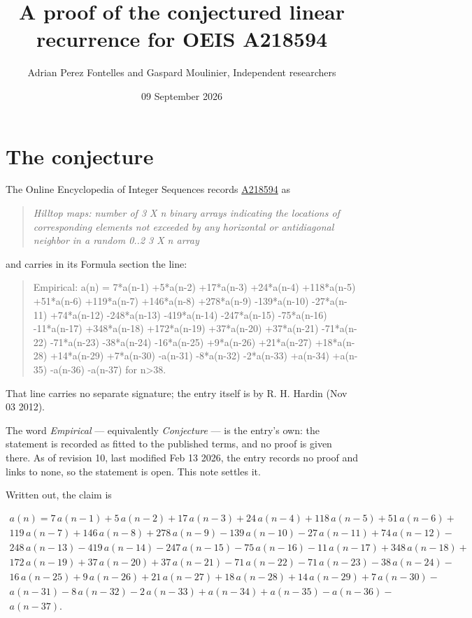 \documentclass[11pt]{article}
\title{A proof of the conjectured linear recurrence for OEIS A218594}
\author{Adrian Perez Fontelles and Gaspard Moulinier, Independent researchers}
\date{09 September 2026}
\theoremstyle{definition}
\begin{document}
\maketitle
\section{The conjecture}

The Online Encyclopedia of Integer Sequences records \href{https://oeis.org/A218594}{A218594} as

\begin{quote}\itshape Hilltop maps: number of 3 X n binary arrays indicating the locations of corresponding elements not exceeded by any horizontal or antidiagonal neighbor in a random 0..2 3 X n array\end{quote}

and carries in its Formula section the line:

\begin{quote}\ttfamily Empirical: a(n) = 7*a(n-1) +5*a(n-2) +17*a(n-3) +24*a(n-4) +118*a(n-5) +51*a(n-6) +119*a(n-7) +146*a(n-8) +278*a(n-9) -139*a(n-10) -27*a(n-11) +74*a(n-12) -248*a(n-13) -419*a(n-14) -247*a(n-15) -75*a(n-16) -11*a(n-17) +348*a(n-18) +172*a(n-19) +37*a(n-20) +37*a(n-21) -71*a(n-22) -71*a(n-23) -38*a(n-24) -16*a(n-25) +9*a(n-26) +21*a(n-27) +18*a(n-28) +14*a(n-29) +7*a(n-30) -a(n-31) -8*a(n-32) -2*a(n-33) +a(n-34) +a(n-35) -a(n-36) -a(n-37) for n>38.\end{quote}

That line carries no separate signature; the entry itself is by R. H. Hardin (Nov 03 2012).

The word {\itshape Empirical} --- equivalently {\itshape Conjecture} --- is the entry's own: the statement is recorded as fitted to the published terms, and no proof is given there. As of revision 10, last modified Feb 13 2026, the entry records no proof and links to none, so the statement is open. This note settles it.

Written out, the claim is

\begin{multline*} a(n) = 7\,a(n-1) + 5\,a(n-2) + 17\,a(n-3) + 24\,a(n-4) + 118\,a(n-5) + 51\,a(n-6) + \\ 119\,a(n-7) + 146\,a(n-8) + 278\,a(n-9) - 139\,a(n-10) - 27\,a(n-11) + 74\,a(n-12) - \\ 248\,a(n-13) - 419\,a(n-14) - 247\,a(n-15) - 75\,a(n-16) - 11\,a(n-17) + 348\,a(n-18) + \\ 172\,a(n-19) + 37\,a(n-20) + 37\,a(n-21) - 71\,a(n-22) - 71\,a(n-23) - 38\,a(n-24) - \\ 16\,a(n-25) + 9\,a(n-26) + 21\,a(n-27) + 18\,a(n-28) + 14\,a(n-29) + 7\,a(n-30) - \\ a(n-31) - 8\,a(n-32) - 2\,a(n-33) + a(n-34) + a(n-35) - a(n-36) - \\ a(n-37). \end{multline*}
\end{document}
